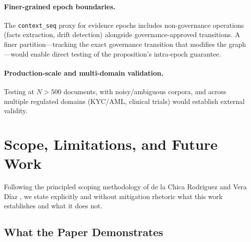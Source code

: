 \documentclass[11pt]{article}
\begin{document}
\paragraph{Finer-grained epoch boundaries.} The \texttt{context\_seq} proxy for evidence epochs includes non-governance operations (facts extraction, drift detection) alongside governance-approved transitions. A finer partition---tracking the exact governance transition that modifies the graph---would enable direct testing of the proposition's intra-epoch guarantee.

\paragraph{Production-scale and multi-domain validation.} Testing at $N > 500$ documents, with noisy/ambiguous corpora, and across multiple regulated domains (KYC/AML, clinical trials) would establish external validity.

\section{Scope, Limitations, and Future Work}
\label{sec:boundaries}

Following the principled scoping methodology of de la Chica Rodriguez and Vera D\'{i}az \cite{delachica2026}, we state explicitly and without mitigation rhetoric what this work establishes and what it does not.

\subsection{What the Paper Demonstrates}
\end{document}
